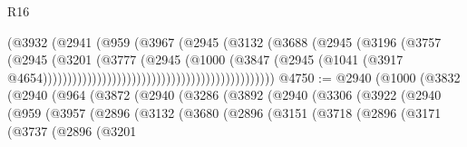 \begin{lexlean}{R16}
\begin{coremodule}
                                                            (@3932
                                                              (@2941
                                                                (@959
                                                                  (@3967
                                                                    (@2945
                                                                      (@3132
                                                                        (@3688
                                                                          (@2945
                                                                            (@3196
                                                                              (@3757
                                                                                (@2945
                                                                                  (@3201
                                                                                    (@3777
                                                                                      (@2945
                                                                                        (@1000
                                                                                          (@3847
                                                                                            (@2945
                                                                                              (@1041
                                                                                                (@3917
                                                                                                  @4654)))))))))))))))))))))))))))))))))))))))))))))))
@4750 := @2940
    (@1000
      (@3832
        (@2940
          (@964
            (@3872
              (@2940
                (@3286
                  (@3892
                    (@2940
                      (@3306
                        (@3922
                          (@2940
                            (@959
                              (@3957
                                (@2896
                                  (@3132
                                    (@3680
                                      (@2896
                                        (@3151
                                          (@3718
                                            (@2896
                                              (@3171
                                                (@3737
                                                  (@2896
                                                    (@3201

\end{coremodule}
\end{lexlean}
